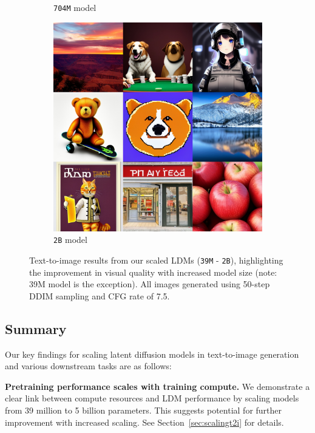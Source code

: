 \begin{figure}[!t]
\begin{subfigure}[b]{0.32\textwidth}
    \caption{\texttt{704M} model}
    \end{subfigure}
    \begin{subfigure}[b]{0.32\textwidth}
    \centering
    \includegraphics[width=\textwidth]{cp2/figures/t2i/c512.jpg}
    \caption{\texttt{2B} model}
    \end{subfigure}
\caption{
Text-to-image results from our scaled LDMs (\texttt{39M} - \texttt{2B}), highlighting the improvement in visual quality with increased model size (note: 39M model is the exception). All images generated using 50-step DDIM sampling and CFG rate of 7.5.
}
\label{fig:t2i_results}
\end{figure}


\subsection{Summary}
Our key findings for scaling latent diffusion models in text-to-image generation and various downstream tasks are as follows:

\noindent \textbf{Pretraining performance scales with training compute.}
We demonstrate a clear link between compute resources and LDM performance by scaling models from 39 million to 5 billion parameters.  This suggests potential for further improvement with increased scaling. See Section~\ref{sec:scalingt2i} for details.

